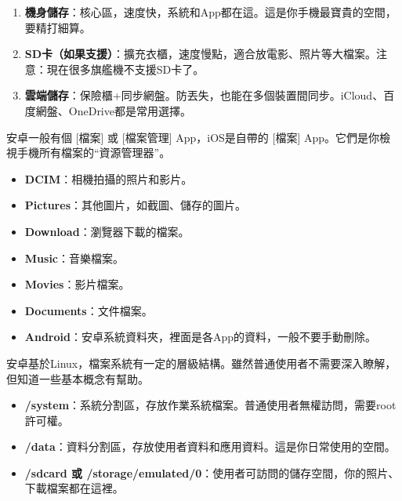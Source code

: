 


\begin{enumerate}
  \item \textbf{機身儲存}：核心區，速度快，系統和App都在這。這是你手機最寶貴的空間，要精打細算。
  \item \textbf{SD卡（如果支援）}：擴充衣櫃，速度慢點，適合放電影、照片等大檔案。注意：現在很多旗艦機不支援SD卡了。
  \item \textbf{雲端儲存}：保險櫃+同步網盤。防丟失，也能在多個裝置間同步。iCloud、百度網盤、OneDrive都是常用選擇。
\end{enumerate}


安卓一般有個 [檔案] 或 [檔案管理] App，iOS是自帶的 [檔案] App。它們是你檢視手機所有檔案的“資源管理器”。


\begin{itemize}
  \item \textbf{DCIM}：相機拍攝的照片和影片。
  \item \textbf{Pictures}：其他圖片，如截圖、儲存的圖片。
  \item \textbf{Download}：瀏覽器下載的檔案。
  \item \textbf{Music}：音樂檔案。
  \item \textbf{Movies}：影片檔案。
  \item \textbf{Documents}：文件檔案。
  \item \textbf{Android}：安卓系統資料夾，裡面是各App的資料，一般不要手動刪除。
\end{itemize}


安卓基於Linux，檔案系統有一定的層級結構。雖然普通使用者不需要深入瞭解，但知道一些基本概念有幫助。


\begin{itemize}
  \item \textbf{/system}：系統分割區，存放作業系統檔案。普通使用者無權訪問，需要root許可權。
  \item \textbf{/data}：資料分割區，存放使用者資料和應用資料。這是你日常使用的空間。
  \item \textbf{/sdcard 或 /storage/emulated/0}：使用者可訪問的儲存空間，你的照片、下載檔案都在這裡。
\end{itemize}

